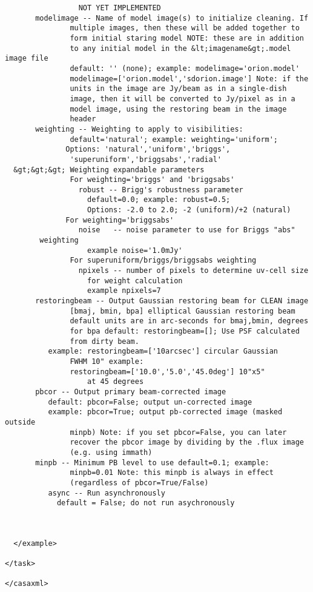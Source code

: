 \begin{verbatim}
                 NOT YET IMPLEMENTED                
       modelimage -- Name of model image(s) to initialize cleaning. If
               multiple images, then these will be added together to
               form initial staring model NOTE: these are in addition
               to any initial model in the &lt;imagename&gt;.model image file
               default: '' (none); example: modelimage='orion.model'
               modelimage=['orion.model','sdorion.image'] Note: if the
               units in the image are Jy/beam as in a single-dish
               image, then it will be converted to Jy/pixel as in a
               model image, using the restoring beam in the image
               header
       weighting -- Weighting to apply to visibilities:
               default='natural'; example: weighting='uniform';
              Options: 'natural','uniform','briggs', 
 		       'superuniform','briggsabs','radial'
  &gt;&gt;&gt; Weighting expandable parameters
               For weighting='briggs' and 'briggsabs'
                 robust -- Brigg's robustness parameter
                   default=0.0; example: robust=0.5;
                   Options: -2.0 to 2.0; -2 (uniform)/+2 (natural)
              For weighting='briggsabs'
                 noise   -- noise parameter to use for Briggs "abs" 
 		weighting
                   example noise='1.0mJy'
               For superuniform/briggs/briggsabs weighting
                 npixels -- number of pixels to determine uv-cell size
                   for weight calculation
                   example npixels=7
       restoringbeam -- Output Gaussian restoring beam for CLEAN image
               [bmaj, bmin, bpa] elliptical Gaussian restoring beam
               default units are in arc-seconds for bmaj,bmin, degrees
               for bpa default: restoringbeam=[]; Use PSF calculated
               from dirty beam. 
 	      example: restoringbeam=['10arcsec'] circular Gaussian 
 		       FWHM 10" example:
 		       restoringbeam=['10.0','5.0','45.0deg'] 10"x5" 
 	               at 45 degrees
       pbcor -- Output primary beam-corrected image 
 	      default: pbcor=False; output un-corrected image 
 	      example: pbcor=True; output pb-corrected image (masked outside
               minpb) Note: if you set pbcor=False, you can later
               recover the pbcor image by dividing by the .flux image
               (e.g. using immath)
       minpb -- Minimum PB level to use default=0.1; example:
               minpb=0.01 Note: this minpb is always in effect
               (regardless of pbcor=True/False) 
 	      async -- Run asynchronously 
  		    default = False; do not run asychronously



  </example>

</task>

</casaxml>
\end{verbatim}

